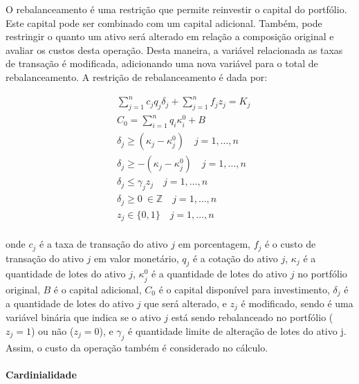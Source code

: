                     \ipar O rebalanceamento é uma restrição que permite reinvestir o capital do portfólio. Este capital pode ser combinado com um capital adicional. Também, pode restringir o quanto um ativo será alterado em relação a composição original e avaliar os custos desta operação. Desta maneira, a variável relacionada as taxas de transação é modificada, adicionando uma nova variável para o total de rebalanceamento. A restrição de rebalanceamento é dada por:

                    \begin{equation}
                        \begin{aligned}
                            & \sum_{j=1}^{n}c_{j}q_{j}\delta_{j} + \sum_{j=1}^{n} f_{j} z_{j}  = K_{j} \\
                            & C_{0} = \sum_{i=1}^{n}q_{i}\kappa_{i}^{0}+ B \\
                            & \delta_{j} \geq \left( \kappa_{j} -\kappa_{j}^{0} \right) \quad j=1, \ldots, n\\
                            & \delta_{j} \geq -\left( \kappa_{j} -\kappa_{j}^{0} \right) \quad j=1, \ldots, n\\
                            & \delta_{j} \leq \gamma_{j}z_{j} \quad j=1, \ldots, n\\
                            & \delta_{j} \geq 0 \ \in \mathbb{Z} \quad j=1, \ldots, n\\
                            & z_{j} \in\{0,1\} \quad j=1, \ldots, n \\
                        \end{aligned}
                    \end{equation}

                    \noindent onde $c_{j}$ é a taxa de transação do ativo $j$ em porcentagem, $f_{j}$ é o custo de transação do ativo $j$ em valor monetário, $q_{j}$ é a cotação do ativo $j$, $\kappa_{j}$ é a quantidade de lotes do ativo $j$, $\kappa_{j}^{0}$ é a quantidade de lotes do ativo $j$ no portfólio original, $B$ é o capital adicional, $C_{0}$ é o capital disponível para investimento, $\delta_{j}$ é a quantidade de lotes do ativo $j$ que será alterado, e $z_{j}$ é modificado, sendo é uma variável binária que indica se o ativo $j$ está sendo rebalanceado no portfólio ($z_{j}=1$) ou não ($z_{j}=0$), e $\gamma_{j}$ é quantidade limite de alteração de lotes do ativo j. Assim, o custo da operação também é considerado no cálculo.


                \paragraph{Cardinialidade}

